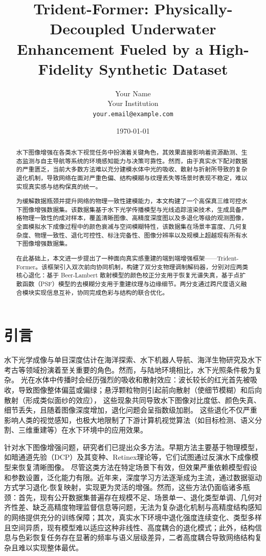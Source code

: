 \documentclass[twocolumn]{article}
\title{Trident-Former: Physically-Decoupled Underwater Enhancement Fueled by a High-Fidelity Synthetic Dataset}
\author{Your Name \\ Your Institution \\ \texttt{your.email@example.com}}
\date{\today}
\begin{document}
\maketitle

\begin{abstract}
水下图像增强在各类水下视觉任务中扮演着关键角色，其效果直接影响着资源勘测、生态监测与自主导航等系统的环境感知能力与决策可靠性。然而，由于真实水下配对数据的严重匮乏，当前大多数方法难以充分建模水体中光的吸收、散射与折射所导致的复杂退化机制，导致网络在面对严重色偏、结构模糊与纹理丢失等场景时表现不稳定，难以实现真实感与结构保真的统一。

为缓解数据瓶颈并提升网络的物理一致性建模能力，本文构建了一个高保真三维可控水下图像增强数据集。该数据集基于水下光学传播模型与光线追踪渲染技术，生成具备严格物理一致性的成对样本，覆盖清晰图像、高精度深度图以及多退化等级的观测图像，全面模拟水下成像过程中的颜色衰减与空间模糊特性，该数据集在场景丰富度、几何复杂度、物理一致性、退化可控性、标注完备性、图像分辨率以及规模上超越现有所有水下图像增强数据集。

在此基础上，本文进一步提出了一种面向真实感重建的端到端增强框架——Trident-Former。该框架引入双次前向协同机制，构建了双分支物理调制解码器，分别对应两类核心退化：基于 Beer-Lambert 散射模型的颜色校正分支用于恢复光谱失真，基于点扩散函数（PSF）模型的去模糊分支用于重建纹理与边缘细节。两分支通过跨尺度语义融合模块实现信息互补，协同完成色彩与结构的联合优化。



\end{abstract}

\section{引言}
水下光学成像与单目深度估计在海洋探索、水下机器人导航、海洋生物研究及水下考古等领域扮演着至关重要的角色。然而，与陆地环境相比，水下光照条件极为复杂。
光在水体中传播时会经历强烈的吸收和散射效应：波长较长的红光首先被吸收，导致图像整体偏蓝或偏绿；悬浮颗粒物则引起前向散射（使细节模糊）和后向散射（形成类似面纱的效应），
这些现象共同导致水下图像对比度低、颜色失真、细节丢失，且随着图像深度增加，退化问题会呈指数级加剧。
这些退化不仅严重影响人类的视觉感知，也极大地限制了下游计算机视觉算法（如目标检测、语义分割、三维重建等）在水下环境中的应用效果。

针对水下图像增强问题，研究者们已提出众多方法。早期方法主要基于物理模型，如暗通道先验（DCP）及其变种、Retinex理论等，它们试图通过反演水下成像模型来恢复清晰图像。
尽管这类方法在特定场景下有效，但效果严重依赖模型假设和参数设置，泛化能力有限。近年来，深度学习方法逐渐成为主流，通过数据驱动方式学习退化-恢复映射，实现更为灵活的增强。然而，这些方法仍面临诸多瓶颈：首先，现有公开数据集普遍存在规模不足、场景单一、退化类型单调、几何对齐性差、缺乏高精度物理监督信息等问题，无法为复杂退化机制与高精度结构感知的网络提供充分的训练保障；其次，真实水下环境中退化强度连续变化、类型多样且空间异质，现有模型难以适应这种非线性、高度耦合的退化模式；此外，结构信息与色彩恢复任务存在显著的频率与语义层级差异，二者高度耦合导致网络结构复杂且难以实现整体最优。
\end{document}
